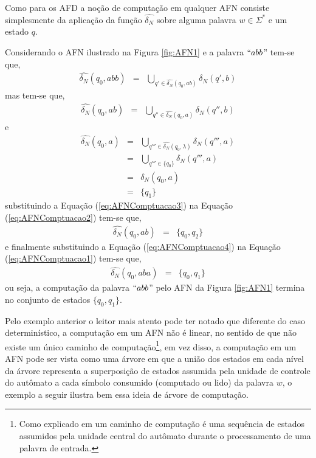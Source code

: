 Como para os AFD a noção de computação em qualquer AFN consiste simplesmente da aplicação da função $\widehat{\delta_N}$ sobre alguma palavra $w \in \Sigma^*$ e um estado $q$. 

\begin{example}\label{exe:ComputacaoAFN}
	Considerando o AFN ilustrado na Figura \ref{fig:AFN1} e a palavra $``abb$'' tem-se que,
	\begin{eqnarray}\label{eq:AFNComptuacao1}
		\widehat{\delta_N}(q_0, abb) & = & \bigcup_{q' \in \widehat{\delta_N}(q_0, ab)} \delta_N(q', b)
	\end{eqnarray}
	mas tem-se que, 
	\begin{eqnarray}\label{eq:AFNComptuacao2}
		\widehat{\delta_N}(q_0, ab) & = & \bigcup_{q'' \in \widehat{\delta_N}(q_0, a)} \delta_N(q'', b)
	\end{eqnarray}
	e
	\begin{eqnarray}\label{eq:AFNComptuacao3}
		\widehat{\delta_N}(q_0, a) & = & \bigcup_{q''' \in \widehat{\delta_N}(q_0, \lambda)} \delta_N(q''', a) \nonumber \\ 
		& = & \bigcup_{q''' \in \{q_0\}} \delta_N(q''', a) \\
		& = & \delta_N(q_0, a) \nonumber \\ 
		& = & \{q_1\} \nonumber
	\end{eqnarray}
	substituindo a Equação (\ref{eq:AFNComptuacao3}) na Equação (\ref{eq:AFNComptuacao2}) tem-se que, 
	\begin{eqnarray}\label{eq:AFNComptuacao4}
		\widehat{\delta_N}(q_0, ab) & = & \{q_0, q_2\}
	\end{eqnarray}
	e finalmente substituindo a Equação (\ref{eq:AFNComptuacao4}) na Equação (\ref{eq:AFNComptuacao1}) tem-se que,
	\begin{eqnarray}
		\widehat{\delta_N}(q_0, aba) & = & \{q_0, q_1\}
	\end{eqnarray}
	ou seja, a computação da palavra $``abb$'' pelo AFN da Figura \ref{fig:AFN1} termina no conjunto de estados $\{q_0, q_1\}$.
\end{example}


Pelo exemplo anterior o leitor mais atento pode ter notado que diferente do caso determinístico, a computação em um AFN não é linear, no sentido de que não existe um único caminho de computação\footnote{Como explicado em \cite{valdi2020phd} um caminho de computação é uma sequência de estados assumidos pela unidade central do autômato durante o processamento de uma palavra de entrada.}, em vez disso, a computação em um AFN pode ser vista como uma árvore em que a união dos estados em cada nível da árvore representa a superposição de estados assumida pela unidade de controle do autômato a cada símbolo consumido (computado ou lido) da palavra $w$, o exemplo a seguir ilustra bem essa ideia de árvore de computação.

